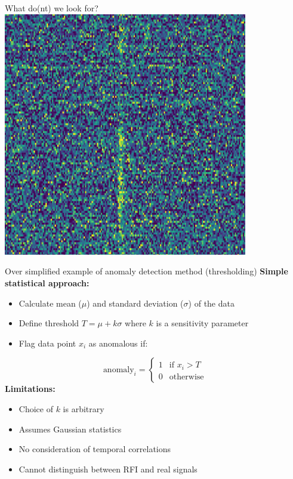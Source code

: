 \documentclass[aspectratio=169]{beamer}
\begin{document}
\begin{frame}{What do(nt) we look for?}
  \centering
  \includegraphics[width=0.8\textwidth]{images/frb.png}
\end{frame}

\begin{frame}{Over simplified example of anomaly detection method (thresholding)}
  \footnotesize
  \textbf{Simple statistical approach:}
  \begin{itemize}
    \item Calculate mean ($\mu$) and standard deviation ($\sigma$) of the data
    \item Define threshold $T = \mu + k\sigma$ where $k$ is a sensitivity parameter
    \item Flag data point $x_i$ as anomalous if:
  \end{itemize}
  \begin{equation}
    \text{anomaly}_i = \begin{cases}
      1 & \text{if } x_i > T \\
      0 & \text{otherwise}
    \end{cases}
  \end{equation}
  \textbf{Limitations:}
  \begin{itemize}
    \item Choice of $k$ is arbitrary
    \item Assumes Gaussian statistics
    \item No consideration of temporal correlations
    \item Cannot distinguish between RFI and real signals
  \end{itemize}
\end{frame}
\end{document}
